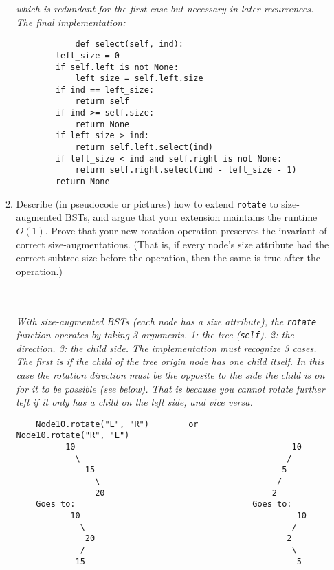 \documentclass[11pt]{article}
\begin{document}
\begin{enumerate}
\begin{enumerate}
        \textit{which is redundant for the first case but necessary in later recurrences. The final implementation:}
        \begin{verbatim}
            def select(self, ind):
        left_size = 0
        if self.left is not None:
            left_size = self.left.size
        if ind == left_size:
            return self
        if ind >= self.size:
            return None
        if left_size > ind:
            return self.left.select(ind)
        if left_size < ind and self.right is not None:
            return self.right.select(ind - left_size - 1)
        return None
        \end{verbatim}  
    
        \item Describe (in pseudocode or pictures) how to extend \texttt{rotate} to size-augmented BSTs, and argue that your extension maintains the runtime $O(1)$. Prove that your new rotation operation preserves the invariant of correct size-augmentations. (That is, if every node's size attribute had the correct subtree size before the operation, then the same is true after the operation.)

        \\\\\textit{
        With size-augmented BSTs (each node has a size attribute), the \texttt{rotate} function operates by taking 3 arguments. 1: the tree (\texttt{self}). 2: the direction. 3: the child side. The implementation must recognize 3 cases. The first is if the child of the tree origin node has one child itself. In this case the rotation direction must be the opposite to the side the child is on for it to be possible (see below). That is because you cannot rotate further left if it only has a child on the left side, and vice versa. 
        }
\begin{verbatim}
    Node10.rotate("L", "R")        or         Node10.rotate("R", "L")
          10                                            10
            \                                          /   
              15                                      5
                \                                    /
                20                                  2
    Goes to:                                    Goes to:   
           10                                            10
             \                                          /     
              20                                       2
             /                                          \
            15                                           5
            

\end{verbatim}
\end{enumerate}
\end{enumerate}
\end{document}
